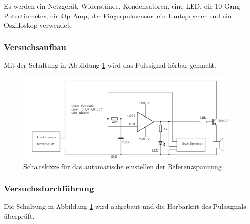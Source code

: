 \documentclass[12pt,a4paper]{article}
\begin{document}
Es werden ein Netzgerät, Widerstände, Kondensatoren, eine LED, ein 10-Gang Potentiometer, ein Op-Amp, der Fingerpulssensor, ein Lautsprecher und ein Oszilloskop verwendet.

\subsubsection*{Versuchsaufbau}

Mit der Schaltung in Abbildung \ref{fig:auf_6} wird das Pulssignal hörbar gemacht.

\begin{figure}[H] 
	\centering
	\includegraphics[scale = 0.3]{auf_6.png}
	\caption[Schaltskizze für das automatische einstellen der Referenzspannung]{Schaltskizze für das automatische einstellen der Referenzspannung\footnotemark}
	\label{fig:auf_6}
\end{figure}

\subsubsection*{Versuchsdurchführung}

Die Schaltung in Abbildung \ref{fig:auf_6} wird aufgebaut und die Hörbarkeit des Pulssignals überprüft.
\end{document}
